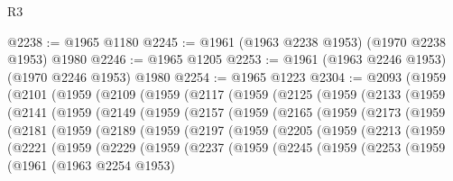 \begin{lexlean}{R3}
\begin{coremodule}
@2238 := @1965 @1180
@2245 := @1961 (@1963 @2238 @1953) (@1970 @2238 @1953) @1980
@2246 := @1965 @1205
@2253 := @1961 (@1963 @2246 @1953) (@1970 @2246 @1953) @1980
@2254 := @1965 @1223
@2304 := @2093
    (@1959
      (@2101
        (@1959
          (@2109
            (@1959
              (@2117
                (@1959
                  (@2125
                    (@1959
                      (@2133
                        (@1959
                          (@2141
                            (@1959
                              (@2149
                                (@1959
                                  (@2157
                                    (@1959
                                      (@2165
                                        (@1959
                                          (@2173
                                            (@1959
                                              (@2181
                                                (@1959
                                                  (@2189
                                                    (@1959
                                                      (@2197
                                                        (@1959
                                                          (@2205
                                                            (@1959
                                                              (@2213
                                                                (@1959
                                                                  (@2221
                                                                    (@1959
                                                                      (@2229
                                                                        (@1959
                                                                          (@2237
                                                                            (@1959
                                                                              (@2245
                                                                                (@1959
                                                                                  (@2253
                                                                                    (@1959
                                                                                      (@1961
                                                                                        (@1963
                                                                                          @2254
                                                                                          @1953)

\end{coremodule}
\end{lexlean}
